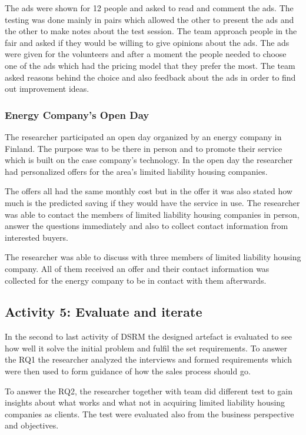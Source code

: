 The ads were shown for 12 people and asked to read and comment the ads. The testing was done mainly in pairs which allowed the other to present the ads and the other to make notes about the test session. The team approach people in the fair and asked if they would be willing to give opinions about the ads. The ads were given for the volunteers and after a moment the people needed to choose one of the ads which had the pricing model that they prefer the most. The team asked reasons behind the choice and also feedback about the ads in order to find out improvement ideas.

\subsubsection*{Energy Company's Open Day}

The researcher participated an open day organized by an energy company in Finland. The purpose was to be there in person and to promote their service which is built on the case company's technology. In the open day the researcher had personalized offers for the area's limited liability housing companies.

The offers all had the same monthly cost but in the offer it was also stated how much is the predicted saving if they would have the service in use. The researcher was able to contact the members of limited liability housing companies in person, answer the questions immediately and also to collect contact information from interested buyers.

The researcher was able to discuss with three members of limited liability housing company. All of them received an offer and their contact information was collected for the energy company to be in contact with them afterwards.

\subsection{Activity 5: Evaluate and iterate}

In the second to last activity of DSRM the designed artefact is evaluated to see how well it solve the initial problem and fulfil the set requirements. To answer the RQ1 the researcher analyzed the interviews and formed requirements which were then used to form guidance of how the sales process should go.

To answer the RQ2, the researcher together with team did different test to gain insights about what works and what not in acquiring limited liability housing companies as clients. The test were evaluated also from the business perspective and objectives.

